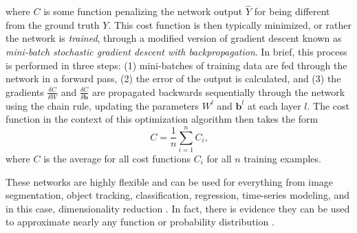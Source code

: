\documentclass[11pt,a4paper,oneside]{article}
\begin{document}
\begin{appendices}
where $C$ is some function penalizing the network output $\hat{Y}$ for being different from the ground truth $Y$. This cost function is then typically minimized, or rather the network is \textit{trained}, through a modified version of gradient descent known as \textit{mini-batch stochastic gradient descent with backpropagation}. In brief, this process is performed in three steps: (1) mini-batches of training data are fed through the network in a forward pass, (2) the error of the output is calculated, and (3) the gradients $\frac{\delta C}{\delta W}$ and $\frac{\delta C}{\delta \textbf{b}}$ are propagated backwards sequentially through the network using the chain rule, updating the parameters $W^l$ and $\mathbf{b}^l$ at each layer $l$. The cost function in the context of this optimization algorithm then takes the form
\begin{equation}
C = \frac{1}{n} \sum_{i=1}^{n} C_i \text{,}
\end{equation}
where $C$ is the average for all cost functions $C_i$ for all $n$ training examples.  
\par
These networks are highly flexible and can be used for everything from image segmentation, object tracking, classification, regression, time-series modeling, and in this case, dimensionality reduction \citep{deeplearningbook}. In fact, there is evidence they can be used to approximate nearly any function or probability distribution \citep{lin2016does}.





\end{appendices}
\end{document}
